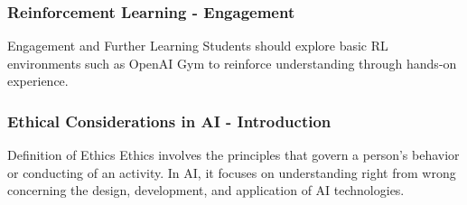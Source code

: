 \documentclass[aspectratio=169]{beamer}
\begin{document}
\begin{frame}[fragile]
    \frametitle{Reinforcement Learning - Engagement}
    \begin{block}{Engagement and Further Learning}
        Students should explore basic RL environments such as OpenAI Gym to reinforce understanding through hands-on experience.
    \end{block}
\end{frame}

\begin{frame}[fragile]
    \frametitle{Ethical Considerations in AI - Introduction}
    \begin{block}{Definition of Ethics}
        Ethics involves the principles that govern a person's behavior or conducting of an activity. In AI, it focuses on understanding right from wrong concerning the design, development, and application of AI technologies.
    \end{block}
\end{frame}
\end{document}
